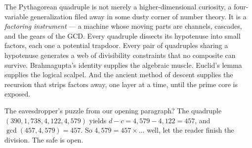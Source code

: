 The Pythagorean quadruple is not merely a higher-dimensional curiosity, a four-variable generalization filed away in some dusty corner of number theory. It is a \textit{factoring instrument} --- a machine whose moving parts are channels, cascades, and the gears of the GCD. Every quadruple dissects its hypotenuse into small factors, each one a potential trapdoor. Every pair of quadruples sharing a hypotenuse generates a web of divisibility constraints that no composite can survive. Brahmagupta's identity supplies the algebraic muscle. Euclid's lemma supplies the logical scalpel. And the ancient method of descent supplies the recursion that strips factors away, one layer at a time, until the prime core is exposed.

The eavesdropper's puzzle from our opening paragraph? The quadruple $(390, 1{,}738, 4{,}122, 4{,}579)$ yields $d - c = 4{,}579 - 4{,}122 = 457$, and $\gcd(457, 4{,}579) = 457$. So $4{,}579 = 457 \times \ldots$ well, let the reader finish the division. The safe is open.

